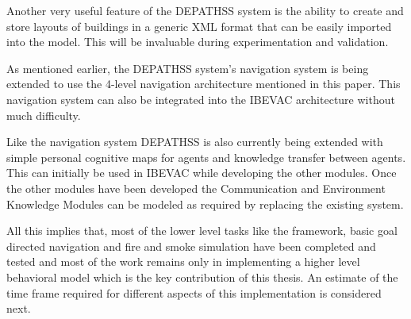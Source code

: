 Another very useful feature of the DEPATHSS system is the ability to create and store layouts of buildings in a generic XML format that can be easily imported into the model. This will be invaluable during experimentation and validation.

As mentioned earlier, the DEPATHSS system's navigation system is being extended to use the 4-level navigation architecture mentioned in this paper. This navigation system can also be integrated into the IBEVAC architecture without much difficulty.

Like the navigation system DEPATHSS is also currently being extended with simple personal cognitive maps for agents and knowledge transfer between agents. This can initially be used in IBEVAC while developing the other modules. Once the other modules have been developed the Communication and Environment Knowledge Modules can be modeled as required by replacing the existing system.

All this implies that, most of the lower level tasks like the framework, basic goal directed navigation and fire and smoke simulation have been completed and tested and most of the work remains only in implementing a higher level behavioral model which is the key contribution of this thesis. An estimate of the time frame required for different aspects of this implementation is considered next.



